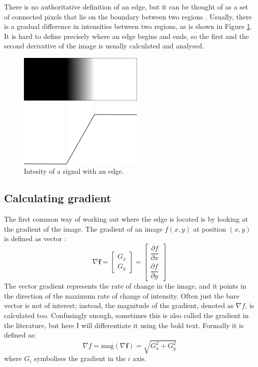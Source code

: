 \documentclass[
  digital,     %
  oneside,     %
  nosansbold,  %
  nocolorbold, %
  lof,         %
  lot,         %
]{fithesis4}
\begin{document}
There is no authoritative definition of an edge, but it can be thought of as a
set of connected pixels that lie on the boundary between two regions
\cite{gonzalez2002}. Usually, there is a gradual difference in intensities
between two regions, as is shown in Figure \ref{fig:edge_intensities}. It is
hard to define precisely where an edge begins and ends, so the first and the
second derivative of the image is usually calculated and analysed.


\begin{figure}
    \begin{center}
        \includegraphics[width=6cm]{resources/inkscape/gradient.png}
    \end{center}
    \caption{Intesity of a signal with an edge.}
    \label{fig:edge_intensities}
\end{figure}

\subsection{Calculating gradient}

The first common way of working out where the edge is located is by looking at
the gradient of the image. The gradient of an image $f(x,y)$ at position $(x,
y)$ is defined as vector
\parencite{gonzalez2002}:
$$\nabla \textbf{f} =
\begin{bmatrix}
    G_x \\
    G_y
\end{bmatrix} =
\begin{bmatrix}
    \dfrac{\partial f}{\partial x}\\[2ex]
    \dfrac{\partial f}{\partial y}
\end{bmatrix}$$
The vector gradient represents the rate of change in the image, and it points in
the direction of the maximum rate of change of intensity. Often just the bare
vector is not of interest; instead, the magnitude of the gradient, denoted as
$\nabla f$, is calculated too. Confusingly enough, sometimes this is also called
the gradient in the literature, but here I will differentiate it using the bold
text. Formally it is defined as:
$$\nabla f = \text{mag}(\nabla \textbf{f}) = \sqrt{G_x^2 + G_y^2}$$
where $G_i$ symbolises the gradient in the $i$ axis.
\end{document}
